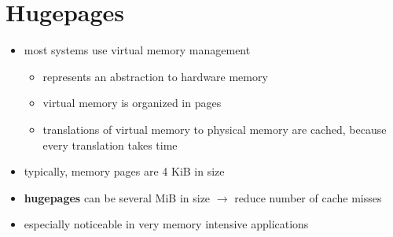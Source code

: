\documentclass{meetings}
\begin{document}
\section{Hugepages}
\vspace{2cm}
\begin{itemize}
	\item most systems use virtual memory management
\begin{itemize}
	\item represents an abstraction to hardware memory
	\item virtual memory is organized in pages
	\item translations of virtual memory to physical memory are cached, because every translation takes time
\end{itemize}
	\item typically, memory pages are 4 KiB in size
	\item \textbf{hugepages} can be several MiB in size $\rightarrow$ reduce number of cache misses
	\item especially noticeable in very memory intensive applications
\end{itemize}








\end{document}
